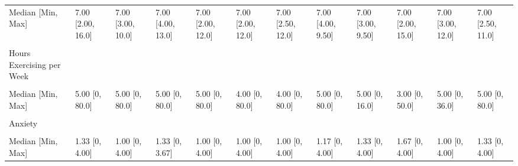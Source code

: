 \documentclass[
  single column]{article}
\begin{document}
\begin{landscape}
\begin{longtable}[t]{llllllllllll}
Median [Min, Max] & 7.00 [2.00, 16.0] & 7.00 [3.00, 10.0] & 7.00 [4.00, 13.0] & 7.00 [2.00, 12.0] & 7.00 [2.00, 12.0] & 7.00 [2.50, 12.0] & 7.00 [4.00, 9.50] & 7.00 [3.00, 9.50] & 7.00 [2.00, 15.0] & 7.00 [3.00, 12.0] & 7.00 [2.50, 11.0]\\
\cellcolor{gray!10}{Missing} & \cellcolor{gray!10}{908 (4.2\%)} & \cellcolor{gray!10}{62 (4.5\%)} & \cellcolor{gray!10}{20 (7.4\%)} & \cellcolor{gray!10}{128 (6.3\%)} & \cellcolor{gray!10}{203 (5.5\%)} & \cellcolor{gray!10}{79 (7.2\%)} & \cellcolor{gray!10}{13 (9.6\%)} & \cellcolor{gray!10}{11 (12.6\%)} & \cellcolor{gray!10}{126 (19.1\%)} & \cellcolor{gray!10}{34 (5.9\%)} & \cellcolor{gray!10}{66 (8.9\%)}\\
Hours Exercising per Week &  &  &  &  &  &  &  &  &  &  & \\
\addlinespace
\cellcolor{gray!10}{Mean (SD)} & \cellcolor{gray!10}{6.39 (7.24)} & \cellcolor{gray!10}{6.90 (8.36)} & \cellcolor{gray!10}{6.68 (7.98)} & \cellcolor{gray!10}{5.97 (6.92)} & \cellcolor{gray!10}{5.74 (6.68)} & \cellcolor{gray!10}{6.11 (8.53)} & \cellcolor{gray!10}{6.23 (8.11)} & \cellcolor{gray!10}{5.33 (3.95)} & \cellcolor{gray!10}{4.23 (5.41)} & \cellcolor{gray!10}{6.17 (6.05)} & \cellcolor{gray!10}{7.49 (9.79)}\\
Median [Min, Max] & 5.00 [0, 80.0] & 5.00 [0, 80.0] & 5.00 [0, 80.0] & 5.00 [0, 80.0] & 4.00 [0, 80.0] & 4.00 [0, 80.0] & 5.00 [0, 80.0] & 5.00 [0, 16.0] & 3.00 [0, 50.0] & 5.00 [0, 36.0] & 5.00 [0, 80.0]\\
\cellcolor{gray!10}{Missing} & \cellcolor{gray!10}{264 (1.2\%)} & \cellcolor{gray!10}{70 (5.1\%)} & \cellcolor{gray!10}{16 (5.9\%)} & \cellcolor{gray!10}{103 (5.1\%)} & \cellcolor{gray!10}{174 (4.7\%)} & \cellcolor{gray!10}{60 (5.5\%)} & \cellcolor{gray!10}{10 (7.4\%)} & \cellcolor{gray!10}{3 (3.4\%)} & \cellcolor{gray!10}{80 (12.2\%)} & \cellcolor{gray!10}{42 (7.3\%)} & \cellcolor{gray!10}{55 (7.4\%)}\\
Anxiety &  &  &  &  &  &  &  &  &  &  & \\
\cellcolor{gray!10}{Mean (SD)} & \cellcolor{gray!10}{1.30 (0.833)} & \cellcolor{gray!10}{1.01 (0.733)} & \cellcolor{gray!10}{1.31 (0.797)} & \cellcolor{gray!10}{1.18 (0.799)} & \cellcolor{gray!10}{1.23 (0.785)} & \cellcolor{gray!10}{1.19 (0.815)} & \cellcolor{gray!10}{1.25 (0.823)} & \cellcolor{gray!10}{1.39 (0.879)} & \cellcolor{gray!10}{1.58 (0.936)} & \cellcolor{gray!10}{1.07 (0.752)} & \cellcolor{gray!10}{1.38 (0.948)}\\
\addlinespace
Median [Min, Max] & 1.33 [0, 4.00] & 1.00 [0, 4.00] & 1.33 [0, 3.67] & 1.00 [0, 4.00] & 1.00 [0, 4.00] & 1.00 [0, 4.00] & 1.17 [0, 4.00] & 1.33 [0, 4.00] & 1.67 [0, 4.00] & 1.00 [0, 4.00] & 1.33 [0, 4.00]\\

\end{longtable}
\end{landscape}
\end{document}
